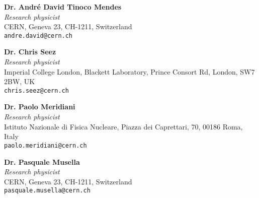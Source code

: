 \documentclass[margin, 10pt]{res} %
\begin{document}
\begin{resume}
\textbf{Dr. Andr\'{e} David Tinoco Mendes} \\
\textit{Research physicist} \\
CERN, Geneva 23, CH-1211, Switzerland \\
\texttt{andre.david@cern.ch}

\textbf{Dr. Chris Seez} \\
\textit{Research physicist} \\
Imperial College London, Blackett Laboratory, Prince Consort Rd, London, SW7 2BW, UK \\
\texttt{chris.seez@cern.ch}

\textbf{Dr. Paolo Meridiani} \\
\textit{Research physicist} \\
Istituto Nazionale di Fisica Nucleare, Piazza dei Caprettari, 70, 00186 Roma, Italy \\
\texttt{paolo.meridiani@cern.ch}

\textbf{Dr. Pasquale Musella} \\
\textit{Research physicist} \\
CERN, Geneva 23, CH-1211, Switzerland \\
\texttt{pasquale.musella@cern.ch}


\end{resume}
\end{document}
